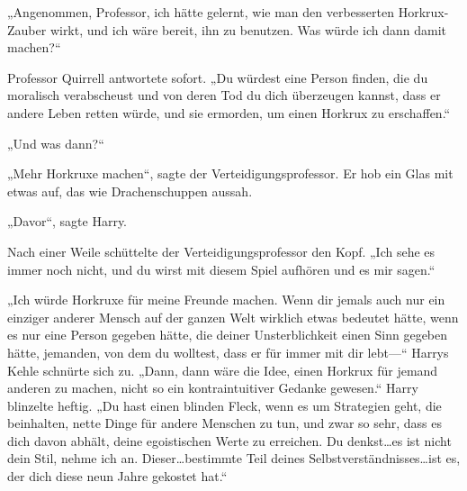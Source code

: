 „Angenommen, Professor, ich hätte gelernt, wie man den verbesserten Horkrux-Zauber wirkt, und ich wäre bereit, ihn zu benutzen. Was würde ich dann damit machen?“

Professor Quirrell antwortete sofort.
„Du würdest eine Person finden, die du moralisch verabscheust und von deren Tod du dich überzeugen kannst, dass er andere Leben retten würde, und sie ermorden, um einen Horkrux zu erschaffen.“

„Und was dann?“

„Mehr Horkruxe machen“, sagte der Verteidigungsprofessor.
Er hob ein Glas mit etwas auf, das wie Drachenschuppen aussah.

„Davor“, sagte Harry.

Nach einer Weile schüttelte der Verteidigungsprofessor den Kopf.
„Ich sehe es immer noch nicht, und du wirst mit diesem Spiel aufhören und es mir sagen.“

„Ich würde Horkruxe für meine Freunde machen. Wenn dir jemals auch nur ein einziger anderer Mensch auf der ganzen Welt wirklich etwas bedeutet hätte, wenn es nur eine Person gegeben hätte, die deiner Unsterblichkeit einen Sinn gegeben hätte, jemanden, von dem du wolltest, dass er für immer mit dir lebt—“
Harrys Kehle schnürte sich zu.
„Dann, dann wäre die Idee, einen Horkrux für jemand anderen zu machen, nicht so ein kontraintuitiver Gedanke gewesen.“
Harry blinzelte heftig.
„Du hast einen blinden Fleck, wenn es um Strategien geht, die beinhalten, nette Dinge für andere Menschen zu tun, und zwar so sehr, dass es dich davon abhält, deine egoistischen Werte zu erreichen. Du denkst…es ist nicht dein Stil, nehme ich an. Dieser…bestimmte Teil deines Selbstverständnisses…ist es, der dich diese neun Jahre gekostet hat.“

